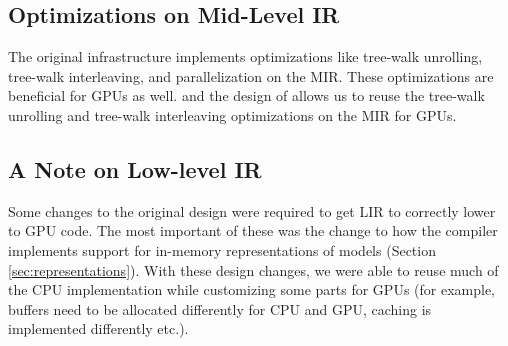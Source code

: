 \subsection{Optimizations on Mid-Level IR}
The original \Treebeard{} infrastructure implements optimizations like 
tree-walk unrolling, tree-walk interleaving, and parallelization
on the MIR. These optimizations are beneficial for GPUs as well.
and the design of \Treebeard{} allows us to reuse the tree-walk 
unrolling and tree-walk interleaving optimizations on the MIR for GPUs.

\subsection{A Note on Low-level IR}
Some changes to the original \Treebeard{} design were required to get
LIR to correctly lower to GPU code. The most important of these was 
the change to how the compiler implements support for in-memory 
representations of models (Section \ref{sec:representations}).
With these design changes, we were able to reuse much of the CPU 
implementation while customizing some parts for GPUs (for example,
buffers need to be allocated differently for CPU and GPU, caching 
is implemented differently etc.). 